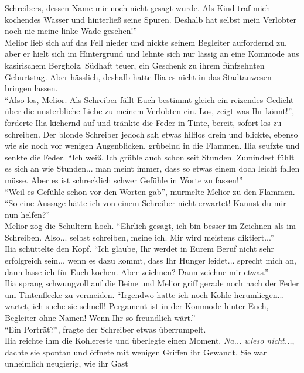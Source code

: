Schreibers, dessen Name mir noch nicht gesagt wurde. Als Kind traf mich kochendes Wasser und 
hinterließ seine Spuren. Deshalb hat selbst mein Verlobter noch nie meine linke Wade gesehen!''\\
Melior ließ sich auf das Fell nieder und nickte seinem Begleiter auffordernd zu, aber er hielt sich 
im Hintergrund und lehnte sich nur lässig an eine Kommode aus kasirischem Bergholz. Südhaft teuer, 
ein Geschenk zu ihrem fünfzehnten Geburtstag. Aber hässlich, deshalb hatte Ilia es nicht in das 
Stadtanwesen bringen lassen.\\
``Also los, Melior. Als Schreiber fällt Euch bestimmt gleich ein reizendes Gedicht über die 
unsterbliche Liebe zu meinem Verlobten ein. Los, zeigt was Ihr könnt!'', forderte Ilia kichernd auf 
und tränkte die Feder in Tinte, bereit, sofort los zu schreiben. Der blonde Schreiber jedoch sah 
etwas hilflos drein und blickte, ebenso wie sie noch vor wenigen Augenblicken, grübelnd in die 
Flammen. Ilia seufzte und senkte die Feder. ``Ich weiß. Ich grüble auch schon seit Stunden. 
Zumindest fühlt es sich an wie Stunden... man meint immer, dass so etwas einem doch leicht fallen 
müsse. Aber es ist schrecklich schwer Gefühle in Worte zu fassen!'' \\
``Weil es Gefühle schon vor den Worten gab'', murmelte Melior zu den Flammen.\\
``So eine Aussage hätte ich von einem Schreiber nicht erwartet! Kannst du mir nun helfen?''\\
Melior zog die Schultern hoch. ``Ehrlich gesagt, ich bin besser im Zeichnen als im Schreiben. 
Also... selbst schreiben, meine ich. Mir wird meistens diktiert...''\\
Ilia schüttelte den Kopf. ``Ich glaube, Ihr werdet in Eurem Beruf nicht sehr erfolgreich sein... 
wenn es dazu kommt, dass Ihr Hunger leidet... sprecht mich an, dann lasse ich für Euch kochen. Aber 
zeichnen? Dann zeichne mir etwas.''\\
Ilia sprang schwungvoll auf die Beine und Melior griff gerade noch nach der Feder um Tintenflecke 
zu vermeiden. ``Irgendwo hatte ich noch Kohle herumliegen... wartet, ich suche sie schnell! 
Pergament ist in der Kommode hinter Euch, Begleiter ohne Namen! Wenn Ihr so freundlich wärt.''\\
``Ein Porträt?'', fragte der Schreiber etwas überrumpelt.\\
Ilia reichte ihm die Kohlereste und überlegte einen Moment. \textit{Na... wieso nicht...}, dachte 
sie spontan und öffnete mit wenigen Griffen ihr Gewandt. Sie war unheimlich neugierig, wie ihr Gast 
